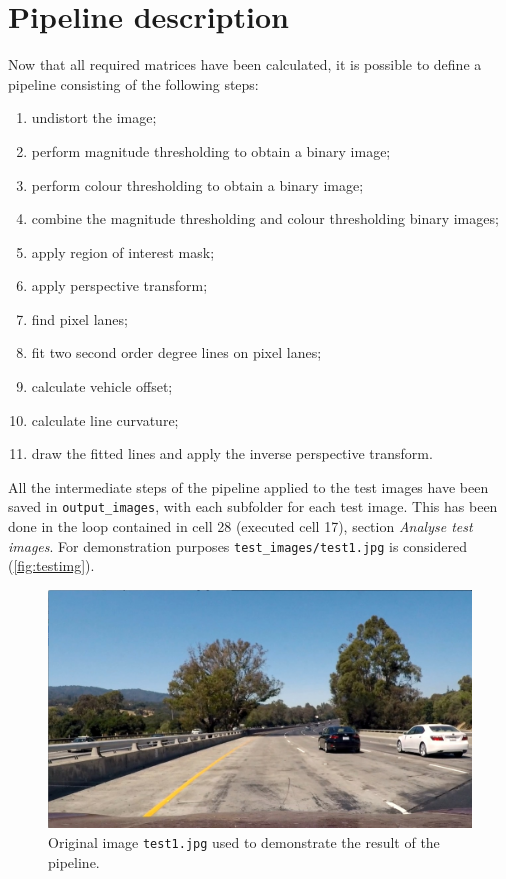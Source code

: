 \documentclass{article}
\let\cd\lstinline
\begin{document}
\section{Pipeline description}
Now that all required matrices have been calculated, it is possible to define a pipeline consisting of the following steps:
\begin{enumerate}	
\item undistort the image;
\item perform magnitude thresholding to obtain a binary image;
\item perform colour thresholding to obtain a binary image;
\item combine the magnitude thresholding and colour thresholding binary images;
\item apply region of interest mask;
\item apply perspective transform; 
\item find pixel lanes;
\item fit two second order degree lines on pixel lanes;
\item calculate vehicle offset;
\item calculate line curvature;
\item draw the fitted lines and apply the inverse perspective transform.
\end{enumerate}

All the intermediate steps of the pipeline applied to the test images have been saved in \cd+output_images+, with each subfolder for each test image. This has been done in the loop contained in cell 28 (executed cell 17), section \textit{Analyse test images}. For demonstration purposes \cd+test_images/test1.jpg+ is considered (\autoref{fig:testimg}).
\begin{figure}
\centering
\includegraphics[scale=0.25]{test_images/test1}
\caption{Original image \cd+test1.jpg+ used to demonstrate the result of the pipeline.}
\label{fig:testimg}
\end{figure}
\end{document}
